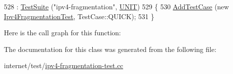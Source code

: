 \begin{DoxyCode}
528   : \hyperlink{classns3_1_1TestSuite_a904b0c40583b744d30908aeb94636d1a}{TestSuite} (\textcolor{stringliteral}{"ipv4-fragmentation"}, \hyperlink{classns3_1_1TestSuite_a1ebfcab34ec8161e085e8e3a1855eae0a3885375a3787abf60431f8454b3cadbd}{UNIT})
529 \{
530   \hyperlink{classns3_1_1TestCase_a3718088e3eefd5d6454569d2e0ddd835}{AddTestCase} (\textcolor{keyword}{new} \hyperlink{classIpv4FragmentationTest}{Ipv4FragmentationTest}, TestCase::QUICK);
531 \}
\end{DoxyCode}


Here is the call graph for this function\+:




The documentation for this class was generated from the following file\+:\begin{DoxyCompactItemize}
\item 
internet/test/\hyperlink{ipv4-fragmentation-test_8cc}{ipv4-\/fragmentation-\/test.\+cc}\end{DoxyCompactItemize}
